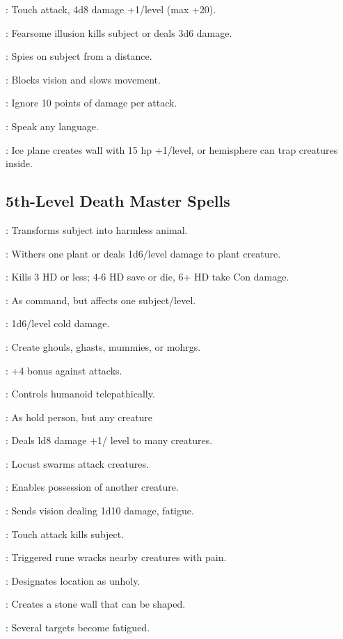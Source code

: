 \begin{multicols}{2}
\begin{description*}
\item[\linkspell{Inflict Critical Wounds}:] Touch attack, 4d8 damage +1/level (max +20).
\item[\linkspell{Phantasmal Killer}:] Fearsome illusion kills subject or deals 3d6 damage.
\item[\linkspell{Scrying}:] Spies on subject from a distance.
\item[\linkspell{Solid Fog}:] Blocks vision and slows movement.
\item[\linkspell{Stoneskin}:] Ignore 10 points of damage per attack.
\item[\linkspell{Tongues}:] Speak any language.
\item[\linkspell{Wall of Ice}:] Ice plane creates wall with 15 hp +1/level, or hemisphere can trap creatures inside.
\end{description*}

\subsection{5th-Level Death Master Spells}
\begin{description*}
\item[\linkspell{Baleful Polymorph}:] Transforms subject into harmless animal.
\item[\linkspell{Blight}:] Withers one plant or deals 1d6/level damage to plant creature.
\item[\linkspell{Cloudkill}:] Kills 3 HD or less; 4-6 HD save or die, 6+ HD take Con damage.
\item[\linkspell{Command, Greater}:] As command, but affects one subject/level.
\item[\linkspell{Cone of Cold}:] 1d6/level cold damage.
\item[\linkspell{Create Undead}:] Create ghouls, ghasts, mummies, or mohrgs.
\item[\linkspell{Dispel Good}:] +4 bonus against attacks.
\item[\linkspell{Dominate Person}:] Controls humanoid telepathically.
\item[\linkspell{Hold Monster}:] As hold person, but any creature
\item[\linkspell{Inflict Light Wounds, Mass}:] Deals ld8 damage +1/ level to many creatures.
\item[\linkspell{Insect Plague}:] Locust swarms attack creatures.
\item[\linkspell{Magic Jar}:] Enables possession of another creature.
\item[\linkspell{Nightmare}:] Sends vision dealing 1d10 damage, fatigue.
\item[\linkspell{Slay Living}:] Touch attack kills subject.
\item[\linkspell{Symbol of Pain}:] Triggered rune wracks nearby creatures with pain.
\item[\linkspell{Unhallow}:] Designates location as unholy.
\item[\linkspell{Wall of Stone}:] Creates a stone wall that can be shaped.
\item[\linkspell{Waves of Fatigue}:] Several targets become fatigued.
\end{description*}


\end{multicols}
